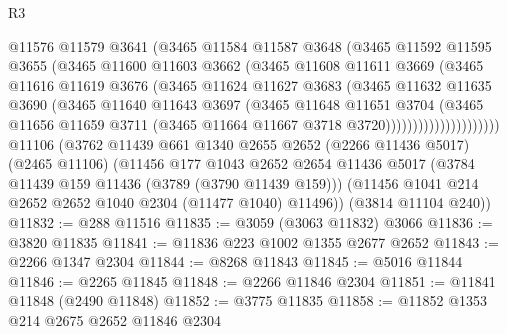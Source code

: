 \begin{lexlean}{R3}
\begin{coremodule}
                        @11576
                        @11579
                        @3641
                        (@3465
                          @11584
                          @11587
                          @3648
                          (@3465
                            @11592
                            @11595
                            @3655
                            (@3465
                              @11600
                              @11603
                              @3662
                              (@3465
                                @11608
                                @11611
                                @3669
                                (@3465
                                  @11616
                                  @11619
                                  @3676
                                  (@3465
                                    @11624
                                    @11627
                                    @3683
                                    (@3465
                                      @11632
                                      @11635
                                      @3690
                                      (@3465
                                        @11640
                                        @11643
                                        @3697
                                        (@3465
                                          @11648
                                          @11651
                                          @3704
                                          (@3465
                                            @11656
                                            @11659
                                            @3711
                                            (@3465 @11664 @11667 @3718 @3720)))))))))))))))))))))
    @11106
    (@3762
      @11439
      @661
      @1340
      @2655
      @2652
      (@2266 @11436 @5017)
      (@2465 @11106)
      (@11456
        @177
        @1043
        @2652
        @2654
        @11436
        @5017
        (@3784 @11439 @159 @11436 (@3789 (@3790 @11439 @159)))
        (@11456 @1041 @214 @2652 @2652 @1040 @2304 (@11477 @1040) @11496))
      (@3814 @11104 @240))
@11832 := @288 @11516
@11835 := @3059 (@3063 @11832) @3066
@11836 := @3820 @11835
@11841 := @11836 @223 @1002 @1355 @2677 @2652
@11843 := @2266 @1347 @2304
@11844 := @8268 @11843
@11845 := @5016 @11844
@11846 := @2265 @11845
@11848 := @2266 @11846 @2304
@11851 := @11841 @11848 (@2490 @11848)
@11852 := @3775 @11835
@11858 := @11852 @1353 @214 @2675 @2652 @11846 @2304

\end{coremodule}
\end{lexlean}
